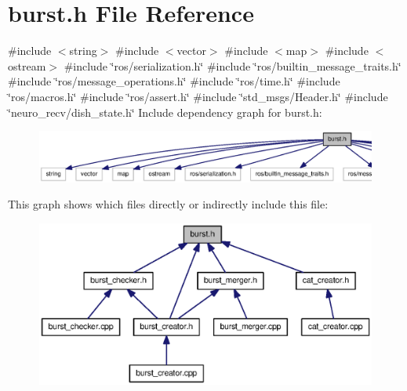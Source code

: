 \section{burst.\-h \-File \-Reference}
\label{burst_8h}
{\ttfamily \#include $<$string$>$}\*
{\ttfamily \#include $<$vector$>$}\*
{\ttfamily \#include $<$map$>$}\*
{\ttfamily \#include $<$ostream$>$}\*
{\ttfamily \#include \char`\"{}ros/serialization.\-h\char`\"{}}\*
{\ttfamily \#include \char`\"{}ros/builtin\-\_\-message\-\_\-traits.\-h\char`\"{}}\*
{\ttfamily \#include \char`\"{}ros/message\-\_\-operations.\-h\char`\"{}}\*
{\ttfamily \#include \char`\"{}ros/time.\-h\char`\"{}}\*
{\ttfamily \#include \char`\"{}ros/macros.\-h\char`\"{}}\*
{\ttfamily \#include \char`\"{}ros/assert.\-h\char`\"{}}\*
{\ttfamily \#include \char`\"{}std\-\_\-msgs/\-Header.\-h\char`\"{}}\*
{\ttfamily \#include \char`\"{}neuro\-\_\-recv/dish\-\_\-state.\-h\char`\"{}}\*
\-Include dependency graph for burst.\-h\-:\nopagebreak
\begin{figure}[H]
\begin{center}
\leavevmode
\includegraphics[width=350pt]{burst_8h__incl}
\end{center}
\end{figure}
\-This graph shows which files directly or indirectly include this file\-:\nopagebreak
\begin{figure}[H]
\begin{center}
\leavevmode
\includegraphics[width=350pt]{burst_8h__dep__incl}
\end{center}
\end{figure}
